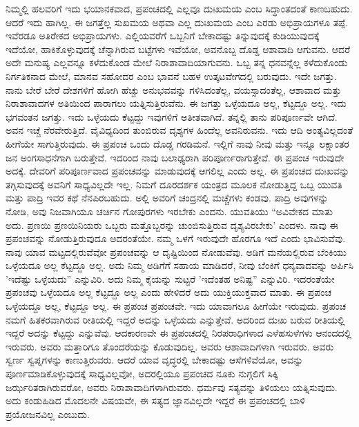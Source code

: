 ನಿಮ್ಮಲ್ಲಿ ಹಲವರಿಗೆ ಇದು ಭಯಾನಕವಾದ, ಪ್ರಪಂಚದಲ್ಲಿ ಎಲ್ಲವೂ ದುಃಖಮಯ ಎಂಬ ಸಿದ್ಧಾಂತದಂತೆ ಕಾಣಬಹುದು. ಆದರೆ ಇದು ಹಾಗಿಲ್ಲ. ಈ ಜಗತ್ತೆಲ್ಲ ಸುಖಮಯ ಅಥವಾ ಎಲ್ಲ ದುಃಖಮಯ ಎಂಬ ಎರಡು ಅಭಿಪ್ರಾಯಗಳೂ ತಪ್ಪೆ. ಇವೆರಡೂ ಅತಿರೇಕದ ಅಭಿಪ್ರಾಯಗಳು. ಎಲ್ಲಿಯವರೆಗೆ ಒಬ್ಬನಿಗೆ ಬೇಕಾದಷ್ಟು ತಿನ್ನುವುದಕ್ಕೆ ಕುಡಿಯುವುದಕ್ಕೆ ಇದೆಯೋ, ಹಾಕಿಕೊಳ್ಳುವುದಕ್ಕೆ ಚೆನ್ನಾಗಿರುವ ಬಟ್ಟೆಗಳು ಇವೆಯೋ, ಅವನೊಬ್ಬ ದೊಡ್ಡ ಆಶಾವಾದಿ ಆಗುವನು. ಆದರೆ ಅದೇ ಮನುಷ್ಯ ಎಲ್ಲವನ್ನೂ ಕಳೆದುಕೊಂಡ ಮೇಲೆ ನಿರಾಶಾವಾದಿಯಾಗುವನು. ಒಬ್ಬ ತನ್ನ ಧನವನ್ನೆಲ್ಲ ಕಳೆದುಕೊಂಡು ನಿರ್ಗತಿಕನಾದ ಮೇಲೆ, ಮಾನವ ಸಹೋದರ ಎಂಬ ಭಾವನೆ ಬಹಳ ಉತ್ಕಟವೇಗದಲ್ಲಿ ಬರುವುದು. ಇದೇ ಜಗತ್ತು. ನಾನು ಬೇರೆ ಬೇರೆ ದೇಶಗಳಿಗೆ ಹೋಗಿ ಹೆಚ್ಚು ಅನುಭವವನ್ನು ಗಳಿಸಿದಂತೆಲ್ಲ, ವಯಸ್ಸಾದಂತೆಲ್ಲ, ಆಶಾವಾದ ಮತ್ತು ನಿರಾಶಾವಾದಗಳ ಅತಿಯಿಂದ ಪಾರಾಗಲು ಯತ್ನಿಸುತ್ತಿರುವೆನು. ಈ ಜಗತ್ತು ಒಳ್ಳೆಯದೂ ಅಲ್ಲ, ಕೆಟ್ಟದ್ದೂ ಅಲ್ಲ. ಇದು ಭಗವಂತನ ಜಗತ್ತು. ಇದು ಒಳ್ಳೆಯದು ಕೆಟ್ಟದ್ದು ಇವುಗಳಿಗೆ ಅತೀತವಾಗಿದೆ. ತನ್ನಲ್ಲಿ ತಾನು ಪರಿಪೂರ್ಣವೇ ಆಗಿದೆ. ಅವನ ಇಚ್ಚೆ ನೆರವೇರುತ್ತಿದೆ. ವೈವಿಧ್ಯದಿಂದ ತುಂಬಿರುವ ದೃಶ್ಯಗಳ ಹಿಂದೆಲ್ಲ ಅವನಿರುವನು. ಇದು ಆದಿ ಅಂತ್ಯವಿಲ್ಲದಂತೆ ಹೀಗೆಯೇ ಸಾಗುತ್ತಿರುವುದು. ಈ ಪ್ರಪಂಚ ಒಂದು ದೊಡ್ಡ ಗರಡಿಮನೆ. ಇಲ್ಲಿಗೆ ನಾವು ನೀವು ಮತ್ತು ಇನ್ನೂ ಲಕ್ಷಾಂತರ ಜನ ಅಂಗಸಾಧನೆಗಾಗಿ ಬರುತ್ತೇವೆ. ಇದರಿಂದ ನಾವು ಬಲಾಢ್ಯರಾಗಿ ಪರಿಪೂರ್ಣರಾಗುತ್ತೇವೆ. ಈ ಪ್ರಪಂಚ ಇರುವುದೇ ಅದಕ್ಕೆ. ದೇವರಿಗೆ ಪರಿಪೂರ್ಣವಾದ ಪ್ರಪಂಚವನ್ನು ಮಾಡುವುದಕ್ಕೆ ಆಗಲಿಲ್ಲ ಎಂದು ಅಲ್ಲ. ಈ ಪ್ರಪಂಚದ ದುಃಖವನ್ನು ತಗ್ಗಿಸುವುದಕ್ಕೆ ಅವನಿಗೆ ಸಾಧ್ಯವಿಲ್ಲದೇ ಇಲ್ಲ. ನಿಮಗೆ ದೂರದರ್ಶಕ ಯಂತ್ರದ ಮೂಲಕ ನೋಡುತ್ತಿದ್ದ ಒಬ್ಬ ಯುವತಿ ಮತ್ತು ಪಾದ್ರಿ ಇವರ ಕಥೆ ನೆನಪಿರಬಹುದು. ಅಲ್ಲಿ ಅವರಿಗೆ ಚಂದ್ರನಲ್ಲಿ ಮಚ್ಚೆಗಳು ಕಂಡವು. ಪಾದ್ರಿ ಅವುಗಳನ್ನು ನೋಡಿ, ಅವು ನಿಜವಾಗಿಯೂ ಚರ್ಚಿನ ಗೋಪುರಗಳು ಇರಬೇಕು ಎಂದನು. ಯುವತಿಯು “ಅವಿವೇಕದ ಮಾತು ಅದು. ಪ್ರಣಯಿ ಪ್ರಣಯಿನಿಯರು ಒಬ್ಬರು ಮತ್ತೊಬ್ಬರನ್ನು ಚುಂಬಿಸುತ್ತಿರುವ ದೃಶ್ಯವಿರಬೇಕು' ಎಂದಳು. ನಾವು ಈ ಪ್ರಪಂಚವನ್ನು ನೋಡುತ್ತಿರುವುದೂ ಅದರಂತೆಯೇ. ನಮ್ಮ ಒಳಗೆ ಇರುವುದೇ ಹೊರಗೂ ಇದೆ ಎಂದು ಭಾವಿಸುವೆವು. ನಾವು ಯಾವ ಮಟ್ಟದಲ್ಲಿರುವೆವೋ ಪ್ರಪಂಚವನ್ನು ಆ ದೃಷ್ಟಿಯಿಂದ ನೋಡುವೆವು. ಅಡಿಗೆ ಮನೆಯಲ್ಲಿರುವ ಬೆಂಕಿಯು ಒಳ್ಳೆಯದೂ ಅಲ್ಲ ಕೆಟ್ಟದ್ದೂ ಅಲ್ಲ. ಅದು ನಿಮ್ಮ ಅಡಿಗೆಗೆ ಸಹಾಯ ಮಾಡಿದರೆ, ನೀವು ಬೆಂಕಿಗೆ ಧನ್ಯವಾದವನ್ನು ಅರ್ಪಿಸಿ 'ಇದೆಷ್ಟು ಒಳ್ಳೆಯದು'' ಎನ್ನುವಿರಿ. ಅದು ನಿಮ್ಮ ಕೈಯನ್ನು ಸುಟ್ಟರೆ 'ಇದೆಂತಹ ಅನಿಷ್ಟ'' ಎನ್ನುವಿರಿ. ಇದರಂತೆಯೇ ಪ್ರಪಂಚವು ಒಳ್ಳೆಯದೂ ಅಲ್ಲ ಕೆಟ್ಟದ್ದೂ ಅಲ್ಲ ಎಂದು ಹೇಳಿದರೆ ಅದು ಯುಕ್ತಿಯುಕ್ತವಾದ ಮಾತು. ಈ ಪ್ರಪಂಚ ಒಳ್ಳೆಯದ್ದೂ ಅಲ್ಲ, ಕೆಟ್ಟದ್ದೂ ಅಲ್ಲ. ಈ ಪ್ರಪಂಚ ಪ್ರಪಂಚವೇ. ಇದು ಯಾವಾಗಲೂ ಹೀಗೆಯೇ ಇರುವುದು. ಪ್ರಪಂಚ ನಮಗೆ ಹಿತಕರವಾಗಿರುವ ರೀತಿಯಲ್ಲಿ ಇದ್ದರೆ ಅದನ್ನು ಒಳ್ಳೆಯದು ಎನ್ನುತ್ತೇವೆ. ಅದರಿಂದ ದುಃಖ ಬರುವ ರೀತಿಯಲ್ಲಿ ಇದ್ದರೆ ಅದನ್ನು ಕೆಟ್ಟದ್ದು ಎನ್ನುವೆವು. ಆದಕಾರಣವೇ ಈ ಪ್ರಪಂಚದಲ್ಲಿ ನಿರಪರಾಧಿಗಳಾದ ಎಳೆಹಸುಳೆಗಳು ಆನಂದದಲ್ಲಿ ಇರುವರು. ಅವರು ಮತ್ತಾರಿಗೂ ತೊಂದರೆಯನ್ನು ಕೊಡುವುದಿಲ್ಲ. ಅವರು ಆಶಾವಾದಿಗಳಾಗಿ ಇರುವರು. ಅವರು ಸ್ವರ್ಣ ಸ್ವಪ್ನಗಳನ್ನು ಕಾಣುತ್ತಿರುವರು. ಆದರೆ ಯಾವ ವೃದ್ಧರಲ್ಲಿ ಬೇಕಾದಷ್ಟು ಆಸೆಗಳಿವೆಯೋ, ಅವನ್ನು ಪೂರ್ಣಮಾಡಿಕೊಳ್ಳುವುದಕ್ಕೆ ಸಾಧ್ಯವಿಲ್ಲವೋ, ಅದರಲ್ಲಿಯೂ ಪ್ರಪಂಚದ ನೂಕು ನುಗ್ಗಲಿಗೆ ಸಿಕ್ಕಿ ಜರ್ಝರಿತರಾಗಿರುವರೋ, ಅವರು ನಿರಾಶಾವಾದಿಗಳಾಗಿರುವರು. ಧರ್ಮವು ಸತ್ಯವನ್ನು ತಿಳಿಯಲು ಯತ್ನಿಸುವುದು. ಅದು ಕಂಡುಹಿಡಿದ ಮೊದಲನೇ ವಿಷಯವೇ, ಈ ಸತ್ಯದ ಜ್ಞಾನವಿಲ್ಲದೇ ಇದ್ದರೆ ಈ ಪ್ರಪಂಚದಲ್ಲಿ ಬಾಳಿ ಪ್ರಯೋಜನವಿಲ್ಲ ಎಂಬುದು.

